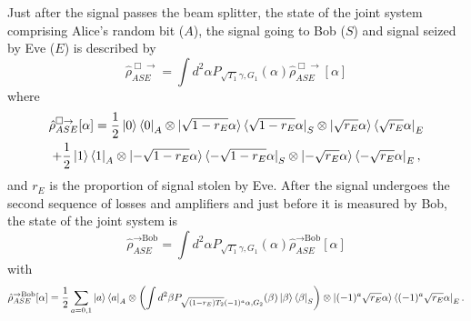 \documentclass[a4paper]{article}
\begin{document}
Just after the signal passes the beam splitter, the state of the joint system comprising Alice's random bit ($A$), the signal going to Bob ($S$) and signal seized by Eve ($E$) is described by
\begin{equation}
    \hat{\rho}^{\Box \rightarrow}_{ASE} = \int d^2 \alpha P_{\sqrt{T_1}\gamma, G_1}(\alpha)\hat{\rho}^{\Box \rightarrow}_{ASE}[\alpha] 
\end{equation}
where
\begin{equation}
\begin{gathered}
    \hat{\rho}^{\Box \rightarrow}_{ASE}[\alpha] = \frac{1}{2}\ket{0}\bra{0}_A \otimes \ket{\sqrt{1 - r_E}\alpha}\bra{\sqrt{1 - r_E}\alpha}_S \otimes\ket{\sqrt{r_E}\alpha}\bra{\sqrt{r_E}\alpha}_E\\
    + \frac{1}{2}\ket{1}\bra{1}_A \otimes \ket{-\sqrt{1 - r_E}\alpha}\bra{-\sqrt{1 - r_E}\alpha}_S \otimes\ket{-\sqrt{r_E}\alpha}\bra{-\sqrt{r_E}\alpha}_E,
\end{gathered}
\end{equation}
and $r_E$ is the proportion of signal stolen by Eve.
After the signal undergoes the second sequence of losses and amplifiers and just before it is measured by Bob, the state of the joint system is
\begin{equation}
    \hat{\rho}^{\rightarrow \text{Bob}}_{ASE} = \int d^2 \alpha P_{\sqrt{T_1}\gamma, G_1}(\alpha)\hat{\rho}^{\rightarrow \text{Bob}}_{ASE}[\alpha] 
\end{equation}
with
\begin{equation}
\begin{gathered}
    \hat{\rho}^{\rightarrow \text{Bob}}_{ASE}[\alpha] = \frac{1}{2}\sum_{a=0,1} \ket{a}\bra{a}_A \otimes \left(\int d^2 \beta P_{\sqrt{(1 - r_E)T_2}(-1)^a \alpha, G_2}(\beta)\ket{\beta}\bra{\beta}_S\right) \otimes\ket{(-1)^a\sqrt{r_E}\alpha}\bra{(-1)^a\sqrt{r_E}\alpha}_E.
\end{gathered}
\end{equation}
\end{document}
